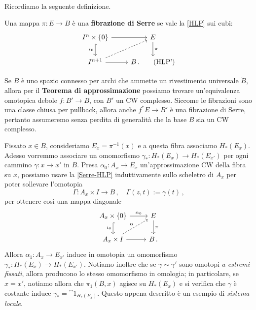 Ricordiamo la seguente definizione.

\begin{df}
	Una mappa $\pi : E \to B$ è una \textbf{fibrazione di Serre} se
	vale la \eqref{HLP} sui cubi:
	\begin{equation}\label{Serre-HLP}
		\begin{tikzcd}
			I^{n} \times \{0\} \ar[r] \ar[d, "\iota_{0}"', hook] & E \ar[d, "\pi"] \\
			I^{n+1} \ar[r] \ar[ur, dashed] & B\,. \tag{HLP'}
		\end{tikzcd}
	\end{equation}
\end{df}

Se $B$ è uno spazio connesso per archi che ammette un rivestimento universale $\widetilde{B}$,
allora per il \textbf{Teorema di approssimazione} possiamo trovare un'equivalenza
omotopica debole $f: B' \to B$, con $B'$ un CW complesso. Siccome le fibrazioni
sono una classe chiusa per pullback, allora anche $f^{*}E \to B'$ 
è una fibrazione di Serre, pertanto assumeremo 
senza perdita di generalità che la base $B$ sia un CW complesso.

Fissato $x \in B$, consideriamo  $E_{x} = \pi^{-1}(x)$ e
a questa fibra associamo $H_{*}(E_{x})$. 
Adesso vorremmo associare un omomorfismo 
$\gamma_{*} : H_{*}(E_{x}) \to H_{*}(E_{x'})$
per ogni cammino
$\gamma : x \to x'$ in $B$. 
Presa $\alpha_{0} : A_{x} \to E_{x}$ un'approssimazione CW della fibra su $x$,
possiamo usare la \eqref{Serre-HLP} induttivamente sullo scheletro di $A_{x}$
per poter sollevare l'omotopia 
\begin{equation*}
	\Gamma: A_{x} \times I \longrightarrow B\,, \quad
	\Gamma(z,t) := \gamma(t)\,,
\end{equation*}
per ottenere così una mappa diagonale
\begin{equation*}
	\begin{tikzcd}
		A_{x} \times \{0\} \ar[r, "\alpha_{0}"] \ar[d, "\iota_{0}"', hook] & E \ar[d, "\pi"] \\
		A_{x} \times I \ar[r] \ar[ur, dashed, "\alpha"] & B\,. 
	\end{tikzcd}
\end{equation*}
Allora $\alpha_{1} :A_{x} \to E_{x'}$ induce in omotopia un omomorfismo
$\gamma_{*} : H_{*}(E_{x}) \to H_{*}(E_{x'})$.
Notiamo inoltre che se $\gamma \sim \gamma'$ sono omotopi \emph{a estremi fissati},
allora producono lo stesso omomorfismo in omologia; in particolare,
se $x=x'$, notiamo allora che $\pi_{1}(B,x)$ agisce su
$H_{*}(E_{x})$ e si verifica che $\gamma$ è costante induce $\gamma_{*} = \cat{1}_{H_{*}(E_{x})}$.
Questo appena descritto è un esempio di \emph{sistema locale}.

